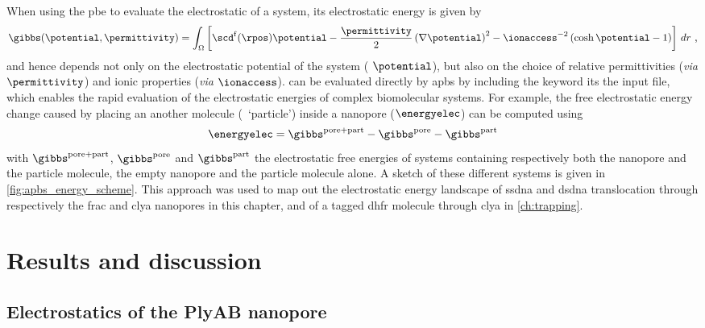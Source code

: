 When using the \gls{pbe} to evaluate the electrostatic of a system, its electrostatic energy is given
by~\cite{Baker-2005}
%
\begin{equation}\label{eq:pbe_energy}
  \gibbs (\potential, \permittivity) = \int_\Omega \left[
    \scd^{\rm{f}}(\rpos) \potential
    - \dfrac{\permittivity}{2}\left( \nabla \potential \right)^2
    - \ionaccess^{-2} \left( \cosh \potential - 1 \right)
  \right] \,dr
  \text{ ,}
\end{equation}
%
and hence depends not only on the electrostatic potential of the system ( $\potential$), but also on
the choice of relative permittivities (\textit{via} $\permittivity$) and ionic properties (\textit{via}
$\ionaccess$).  can be evaluated directly by \gls{apbs} by including the 
keyword its the input file, which enables the rapid evaluation of the electrostatic energies of complex
biomolecular systems. For example, the free electrostatic energy change caused by placing an another molecule
(\ie~`particle') inside a nanopore ($\energyelec$) can be computed using~\cite{Homeyer-2015}
%
\begin{equation}\label{eq:electrostatic_energy}
  \energyelec = \gibbs^{\rm{pore+part}} - \gibbs^{\rm{pore}} - \gibbs^{\rm{part}}
\end{equation}
%
with $\gibbs^{\rm{pore+part}}$, $\gibbs^{\rm{pore}}$ and $\gibbs^{\rm{part}}$ the electrostatic free energies
of systems containing respectively both the nanopore and the particle molecule, the empty nanopore and the
particle molecule alone. A sketch of these different systems is given in \cref{fig:apbs_energy_scheme}. This
approach was used to map out the electrostatic energy landscape of \gls{ssdna} and \gls{dsdna} translocation
through respectively the \gls{frac} and \gls{clya} nanopores in this chapter, and of a tagged \gls{dhfr}
molecule through \gls{clya} in \cref{ch:trapping}.



%
\clearpage
%


\section{Results and discussion}
%
\label{sec:elec:results}
%


\subsection{Electrostatics of the PlyAB nanopore}
%
\label{sec:elec:plyab}
%

